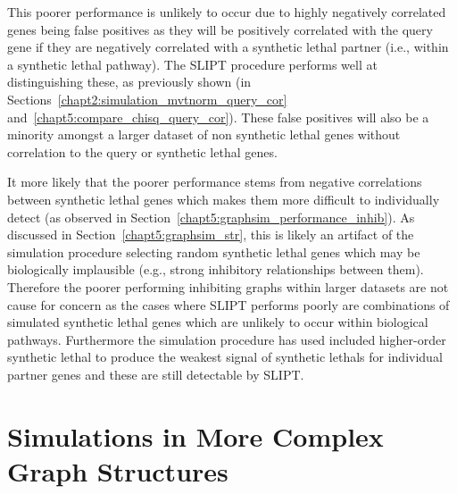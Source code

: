 This poorer performance is unlikely to occur due to highly negatively correlated genes being false positives as they will be positively correlated with the query gene if they are negatively correlated with a \gls{synthetic lethal} partner (i.e., within a \gls{synthetic lethal} pathway). The \gls{SLIPT} procedure performs well at distinguishing these, as previously shown (in Sections~\ref{chapt2:simulation_mvtnorm_query_cor} and~\ref{chapt5:compare_chisq_query_cor}). These false positives will also be a minority amongst a larger dataset of non \gls{synthetic lethal} genes without correlation to the query or \gls{synthetic lethal} genes.

It more likely that the poorer performance stems from negative correlations between \gls{synthetic lethal} genes which makes them more difficult to individually detect (as observed in Section~\ref{chapt5:graphsim_performance_inhib}). As discussed in Section~\ref{chapt5:graphsim_str}, this is likely an artifact of the simulation procedure selecting random \gls{synthetic lethal} genes which may be biologically implausible (e.g., strong inhibitory relationships between them). Therefore the poorer performing inhibiting \glspl{graph} within larger datasets are not cause for concern as the cases where \gls{SLIPT} performs poorly are combinations of simulated \gls{synthetic lethal} genes which are unlikely to occur within biological pathways. Furthermore the simulation procedure has used included higher-order \gls{synthetic lethal} to produce the weakest signal of \glspl{synthetic lethal} for individual partner genes and these are still detectable by \gls{SLIPT}.



\FloatBarrier

\section{Simulations in More Complex Graph Structures}
\label{chapt5:complex_graphs}

